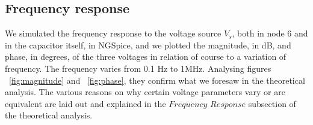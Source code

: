 \subsection{Frequency response}
We simulated the frequency response to the voltage source $V_{s}$, both in node 6 and in the capacitor itself, in NGSpice, and we plotted the magnitude, in dB, and phase, in degrees, of the three voltages in relation of course to a variation of frequency. The frequency varies from 0.1 Hz to 1MHz. Analysing figures ~\ref{fig:magnitude} and ~\ref{fig:phase}, they confirm what we foresaw in the theoretical analysis. The various reasons on why certain voltage parameters vary or are equivalent are laid out and explained in the $Frequency$ $Response$ subsection of the theoretical analysis.
\par
